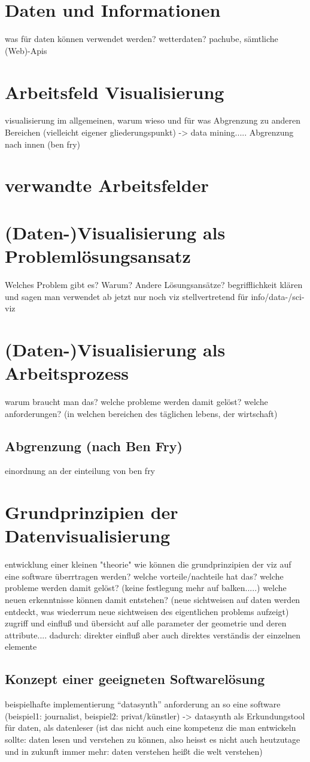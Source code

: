 \documentclass[a4paper, 12pt, onepage, pdftex, headsepline, footsepline]{scrreprt}
\begin{document}
\section{Daten und Informationen}
was für daten können verwendet werden? wetterdaten? pachube, sämtliche (Web)-Apis
\section{Arbeitsfeld Visualisierung}
visualisierung im allgemeinen, warum wieso und für was
Abgrenzung zu anderen Bereichen (vielleicht eigener gliederungspunkt) -> data mining.....
Abgrenzung nach innen (ben fry)
\section{verwandte Arbeitsfelder}
\section{(Daten-)Visualisierung als Problemlösungsansatz}
Welches Problem gibt es?
Warum?
Andere Lösungsansätze?
begrifflichkeit klären und sagen man verwendet ab jetzt nur noch viz stellvertretend für info/data-/sci-viz
\section{(Daten-)Visualisierung als Arbeitsprozess}
warum braucht man das? welche probleme werden damit gelöst?
welche anforderungen? (in welchen bereichen des täglichen lebens, der wirtschaft)
\subsection{Abgrenzung (nach Ben Fry)}
einordnung an der einteilung von ben fry
\section{Grundprinzipien der Datenvisualisierung}
entwicklung einer kleinen "theorie"
wie können die grundprinzipien der viz auf eine software überrtragen werden?
welche vorteile/nachteile hat das?
welche probleme werden damit gelöst? (keine festlegung mehr auf balken.....)
welche neuen erkenntnisse können damit entstehen? (neue sichtweisen auf daten werden entdeckt, was wiederrum neue sichtweisen des eigentlichen problems aufzeigt)
zugriff und einfluß und übersicht auf alle parameter der geometrie und deren attribute....
dadurch: direkter einfluß aber auch direktes verständis der einzelnen elemente
\subsection{Konzept einer geeigneten Softwarelösung}
beispielhafte implementierung “datasynth”
anforderung an so eine software (beispiel1: journalist, beispiel2: privat/künstler)
-> datasynth als Erkundungstool für daten, als datenleser (ist das nicht auch eine kompetenz die man entwickeln sollte: daten lesen und verstehen zu können, also heisst es nicht auch heutzutage und in zukunft immer mehr: daten verstehen heißt die welt verstehen)
\end{document}
